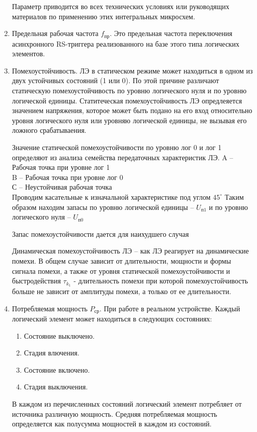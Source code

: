 \documentclass{article}
\begin{document}
\begin{enumerate}
	Параметр приводится во всех технических условиях или руководящих материалов по применению этих интегральных микросхем.
	\item Предельная рабочая частота $f_{пр}$. Это предельная частота переключения асинхронного RS-триггера реализованного на базе этого типа логических
	элементов. 
	\item Помехоустойчивость.
	ЛЭ в статическом режиме может находиться в одном из двух устойчивых состояний (1 или 0). По этой причине различают статическую помехоустойчивость по уровню логического нуля
	и по уровню логической единицы. Статитеческая помехоустойчивость ЛЭ опредлеяется значением напряжения, которое может быть подано на его вход относительно уровня логического
	нуля или уровняю логической единицы, не вызывая его ложного срабатываения.

	Значение статической помехоустойчивости по уровню лог 0 и лог 1 определяют из анализа семейства передаточных характеристик ЛЭ.
	A -- Рабочая точка при уровне лог 1\\
	B -- Рабочая точка при уровне лог 0\\
	С -- Неустойчивая рабочая точка\\
	Проводим касательные к изначальной характеристике под углом $45^{\circ}$
	Таким образом находим запасы по уровню логической единицы -- $U_{п1}$ и по уровню логического нуля -- $U_{п0}$

	Запас помехоустойчивости дается для наихудшего случая
	
	Динамическая помехоустойчивость ЛЭ -- как ЛЭ реагирует на динамические помехи. В общем случае зависит от длительности, мощности и формы сигнала помехи,
	а также от уровня статической помехоустойчивости и быстродействия
	$\tau_{k_1}$ - длительность помехи при которой помехоустойчивость больше не зависит от амплитуды помехи, а только от ее длительности.
	\item Потребляемая мощность $P_{ср}$. При работе в реальном устройстве. Каждый логический элемент может находиться в следующих состояниях:
	\begin{enumerate}
		\item Состояние выключено.
		\item Стадия влючения.
		\item Состояние включено.
		\item Стадия выключения.
	\end{enumerate}
	В каждом из перечисленных состояний логический элемент потребляет от источника различную мощность. Средняя потребляемая мощность определяется как
	полусумма мощностей в каждом из состояний.


\end{enumerate}
\end{document}
